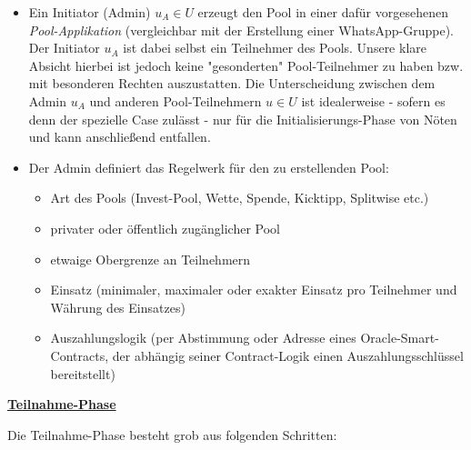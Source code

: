 \begin{itemize}
	\item Ein Initiator (Admin) $u_A \in U$ erzeugt den Pool in einer dafür vorgesehenen \textit{Pool-Applikation} (vergleichbar mit der Erstellung einer WhatsApp-Gruppe). Der Initiator $u_A$ ist dabei selbst ein Teilnehmer des Pools. Unsere klare Absicht hierbei ist jedoch keine "gesonderten" Pool-Teilnehmer zu haben bzw. mit besonderen Rechten auszustatten. Die Unterscheidung zwischen dem Admin $u_A$ und anderen Pool-Teilnehmern $u \in U$ ist idealerweise - sofern es denn der spezielle Case zulässt - nur für die Initialisierungs-Phase von Nöten und kann anschließend entfallen.
	\item Der Admin definiert das Regelwerk für den zu erstellenden Pool:
	\begin{itemize}
		\item Art des Pools (Invest-Pool, Wette, Spende, Kicktipp, Splitwise etc.)
		\item privater oder öffentlich zugänglicher Pool
		\item etwaige Obergrenze an Teilnehmern
		\item Einsatz (minimaler, maximaler oder exakter Einsatz pro Teilnehmer und Währung des Einsatzes)
		\item Auszahlungslogik (per Abstimmung oder Adresse eines Oracle-Smart-Contracts, der abhängig seiner Contract-Logik einen Auszahlungsschlüssel bereitstellt)
	\end{itemize}
\end{itemize}

\vspace{0.3cm}

\underline{\textbf{Teilnahme-Phase}}

\vspace{0.2cm}

Die Teilnahme-Phase besteht grob aus folgenden Schritten:

